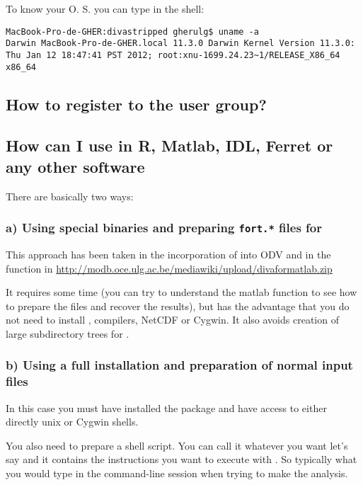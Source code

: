 To know your O. S. you can type in the shell:

\begin{lstlisting}[style=Bash]
MacBook-Pro-de-GHER:divastripped gherulg$ uname -a
Darwin MacBook-Pro-de-GHER.local 11.3.0 Darwin Kernel Version 11.3.0: Thu Jan 12 18:47:41 PST 2012; root:xnu-1699.24.23~1/RELEASE_X86_64 x86_64
\end{lstlisting}

\subsection{How to register to the user group?}




\subsection{How can I use \diva in R, Matlab, IDL, Ferret or any other software}

There are basically two ways:

\subsubsection{a) Using special binaries and preparing {\tt fort.*} files for \diva}

This approach has been taken in the incorporation of \diva into ODV and in the \matlab{} function in \url{http://modb.oce.ulg.ac.be/mediawiki/upload/divaformatlab.zip}

It requires some time (you can try to understand the matlab function to see how to prepare the files and recover the results), but has the advantage that you do not need to install \diva, compilers, NetCDF or Cygwin. It also avoids creation of large subdirectory trees for \diva. 


\subsubsection{b) Using a full \diva installation and preparation of normal \diva input files}

In this case you must have installed the \diva package and have access to either directly unix or Cygwin shells.

You also need to prepare a shell script. You can call it whatever you want let's say  and it contains the instructions you want to execute with \diva. So typically what you would type in the command-line session when trying to make the analysis.

